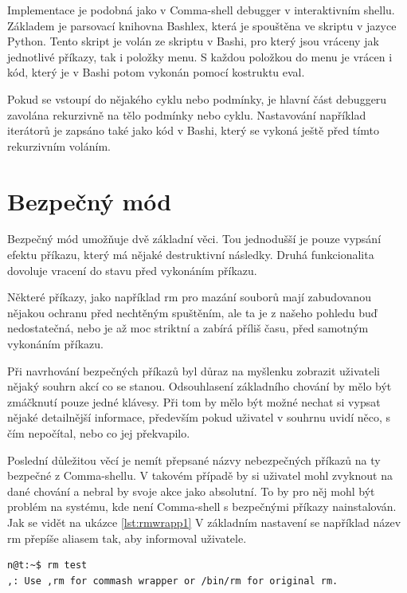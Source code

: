 \documentclass[thesis=M,czech]{FITthesis}[2012/06/26]
\begin{document}
Implementace je podobná jako v Comma-shell debugger v interaktivním shellu. Základem je parsovací knihovna Bashlex, která je spouštěna ve skriptu v jazyce Python. Tento skript je volán ze skriptu v Bashi, pro který jsou vráceny jak jednotlivé příkazy, tak i položky menu. S každou položkou do menu je vrácen i kód, který je v Bashi potom vykonán pomocí kostruktu eval.

Pokud se vstoupí do nějakého cyklu nebo podmínky, je hlavní část debuggeru zavolána rekurzivně na tělo podmínky nebo cyklu. Nastavování například iterátorů je zapsáno také jako kód v Bashi, který se vykoná ještě před tímto rekurzivním voláním.


%
%
%
%
%
\section{Bezpečný mód}

Bezpečný mód umožňuje dvě základní věci. Tou jednodušší je pouze vypsání efektu příkazu, který má nějaké destruktivní následky. Druhá funkcionalita dovoluje vracení do stavu před vykonáním příkazu.

Některé příkazy, jako například rm pro mazání souborů mají zabudovanou nějakou ochranu před nechtěným spuštěním, ale ta je z našeho pohledu buď nedostatečná, nebo je až moc striktní a zabírá příliš času, před samotným vykonáním příkazu.

Při navrhování bezpečných příkazů byl důraz na myšlenku zobrazit uživateli nějaký souhrn akcí co se stanou. Odsouhlasení základního chování by mělo být zmáčknutí pouze jedné klávesy. Při tom by mělo být možné nechat si vypsat nějaké detailnější informace, především pokud uživatel v souhrnu uvidí něco, s čím nepočítal, nebo co jej překvapilo.

Poslední důležitou věcí je nemít přepsané názvy nebezpečných příkazů na ty bezpečné z Comma-shellu. V takovém případě by si uživatel mohl zvyknout na dané chování a nebral by svoje akce jako absolutní. To by pro něj mohl být problém na systému, kde není Comma-shell s bezpečnými příkazy nainstalován. Jak se vidět na ukázce \ref{lst:rmwrapp1} V základním nastavení se například název rm přepíše aliasem tak, aby informoval uživatele.

\begin{minipage}{\linewidth}
\begin{lstlisting}[language=bash, caption={Přepsání nebezpečných příkazů}, label={lst:rmwrapp1}]
n@t:~$ rm test
,: Use ,rm for commash wrapper or /bin/rm for original rm.
\end{lstlisting}
\end{minipage}
\end{document}
